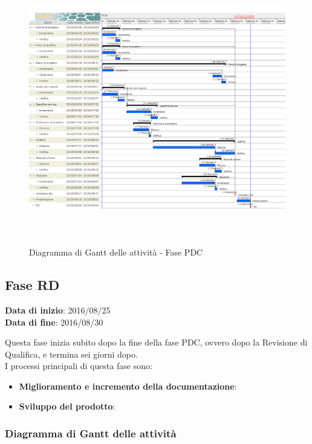 		\begin{figure}[!h]
			\centering
			\includegraphics[height=12cm, width=15cm]{img/gantt/PDC} 
			\caption{Diagramma di Gantt delle attività - Fase PDC}
		\end{figure}
		
	\subsection{Fase RD}
	\begin{center}
		\textbf{Data di inizio}: 2016/08/25 \\
		\textbf{Data di fine}: 2016/08/30 \\
	\end{center}
	Questa fase inizia subito dopo la fine della fase PDC, ovvero dopo la Revisione di Qualifica, e termina sei giorni dopo. \\
	I processi principali di questa fase sono: 
		\begin{itemize}
			\item \textbf{Miglioramento e incremento della documentazione}:
			\att
			\item \textbf{Sviluppo del prodotto}:
			\att
		\end{itemize}
		\subsubsection{Diagramma di Gantt delle attività}
		
